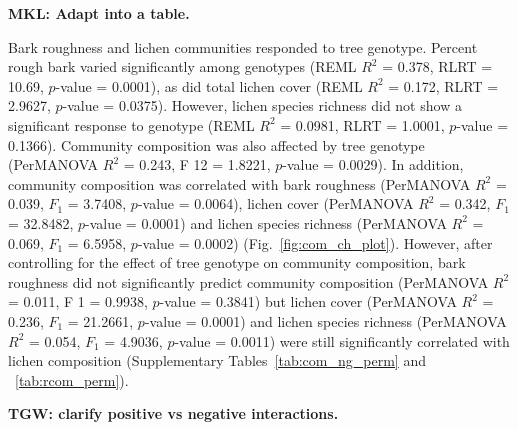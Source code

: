 \documentclass[9pt,twocolumn,twoside,lineno]{pnas-new}
\begin{document}
{\textbf{MKL: Adapt into a table.}

Bark roughness and lichen communities responded to tree
genotype. Percent rough bark varied significantly among genotypes
(REML $R^2$ = 0.378, RLRT = 10.69, $p$-value = 0.0001), as did total
lichen cover (REML $R^2$ = 0.172, RLRT = 2.9627, $p$-value =
0.0375). However, lichen species richness did not show a significant
response to genotype (REML $R^2$ = 0.0981, RLRT = 1.0001, $p$-value =
0.1366). Community composition was also affected by tree genotype
(PerMANOVA $R^2$ = 0.243, F 12 = 1.8221, $p$-value = 0.0029). In
addition, community composition was correlated with bark roughness
(PerMANOVA $R^2$ = 0.039, $F_1$ = 3.7408, $p$-value = 0.0064), lichen
cover (PerMANOVA $R^2$ = 0.342, $F_1$ = 32.8482, $p$-value = 0.0001)
and lichen species richness (PerMANOVA $R^2$ = 0.069, $F_1$ = 6.5958,
$p$-value = 0.0002) (Fig.~\ref{fig:com_ch_plot}). However, after
controlling for the effect of tree genotype on community composition,
bark roughness did not significantly predict community composition
(PerMANOVA $R^2$ = 0.011, F 1 = 0.9938, $p$-value = 0.3841) but lichen
cover (PerMANOVA $R^2$ = 0.236, $F_1$ = 21.2661, $p$-value = 0.0001)
and lichen species richness (PerMANOVA $R^2$ = 0.054, $F_1$ = 4.9036,
$p$-value = 0.0011) were still significantly correlated with lichen
composition (Supplementary Tables~\ref{tab:com_ng_perm} and
~\ref{tab:rcom_perm}).


\textbf{TGW: clarify positive vs negative interactions.}

}
\end{document}
